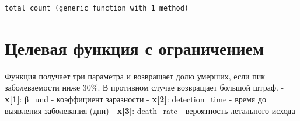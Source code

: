\documentclass[
  12pt,
  a4paper,
  DIV=11,
  numbers=noendperiod]{scrreprt}
\begin{document}
\begin{verbatim}
total_count (generic function with 1 method)
\end{verbatim}

\section{Целевая функция с
ограничением}\label{ux446ux435ux43bux435ux432ux430ux44f-ux444ux443ux43dux43aux446ux438ux44f-ux441-ux43eux433ux440ux430ux43dux438ux447ux435ux43dux438ux435ux43c}

Функция получает три параметра и возвращает долю умерших, если пик
заболеваемости ниже 30\%. В противном случае возвращает большой штраф. -
\textbf{x{[}1{]}}: β\_und - коэффициент заразности - \textbf{x{[}2{]}}:
detection\_time - время до выявления заболевания (дни) -
\textbf{x{[}3{]}}: death\_rate - вероятность летального исхода
\end{document}
